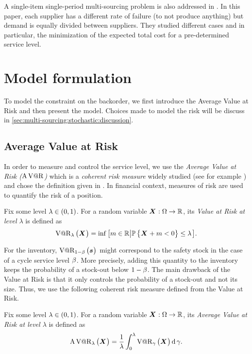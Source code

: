 A single-item single-period multi-sourcing problem is also addressed in \citet{Meena2011}.
In this paper, each supplier has a different rate of failure (\ie to not produce anything) but demand is equally divided between suppliers.
They studied different cases and in particular, the minimization of the expected total cost for a pre-determined service level.




\section{Model formulation}
\label{sec:multi-sourcing:stochastic:model-formulation}


To model the constraint on the backorder, we first introduce the Average Value at Risk and then present the model.
Choices made to model the risk will be discuss in \cref{sec:multi-sourcing:stochastic:discussion}.


\subsection{Average Value at Risk}


In order to measure and control the service level, we use the \emph{Average Value at Risk ($\operatorname{A\operatorname{V@R}}$)} which is a \emph{coherent risk measure} widely studied (see for example \citet{Artzner1999,Rockafellar2000,Rockafellar2002}) and chose the definition given in \citet{Follmer2004}.
In financial context, measures of risk are used to quantify the risk of a position.


Fix some level $\lambda\in\bracket{0,1}$. For a random variable $\va X:\scenarios\to\RR$, its \emph{Value at Risk at level $\lambda$} is defined as
\begin{equation}
\VaR_{\lambda}\bracket{\va X} = \inf\sqbracket{m\in\RR\left|\prob\crbracket{\va X+m<0}\le\lambda\right.}.
\end{equation}


For the inventory, $\VaR_{1-\servicelvl}\bracket{\va\inventory}$ might correspond to the safety stock in the case of a cycle service level $\beta$.
More precisely, adding this quantity to the inventory keeps the probability of a stock-out below $1-\beta$.
The main drawback of the Value at Risk is that it only controls the probability of a stock-out and not its size.
Thus, we use the following coherent risk measure defined from the Value at Risk.


Fix some level $\lambda\in\bracket{0,1}$. For a random variable $\va X:\scenarios\to\RR$, its \emph{Average Value at Risk at level $\lambda$} is defined as
\begin{equation}
\AVaR_{\lambda}\bracket{\va X} = \frac{1}{\lambda}\int_0^{\lambda}\VaR_{\gamma}\bracket{\va X}\diff\gamma.
\end{equation}



